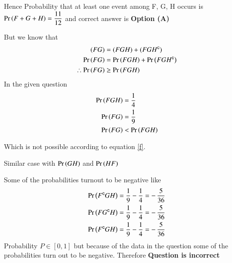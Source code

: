 \documentclass[journal,12pt,twocolumn]{IEEEtran}
\begin{document}
Hence Probability that at least one event among F, G, H occurs is $\Pr\left(F + G + H\right)=\dfrac{11}{12}$ and correct answer is \textbf{Option (A)}
\null \par \null
But we know that 
\begin{align}
(F G) &= (F G H) + (F G H^{\mathsf{c}}) \\
\Pr\left(F G\right) &= \Pr\left(F G H\right) + \Pr\left(F G H^{\mathsf{c}}\right) \\
\therefore \Pr\left(F G\right) &\geq \Pr\left(F G H\right) \label{f}
\end{align}
In the given question 
\begin{align}
\Pr\left(F G H\right) &= \dfrac{1}{4} \\
\Pr\left(F G\right)   &= \dfrac{1}{9} \\
\Pr\left(F G \right) &< \Pr\left(F G H\right) 
\end{align}

Which is not possible according to equation \eqref{f}. 

Similar case with $\Pr\left(G H\right)$ and $\Pr\left(H F\right)$ 

Some of the probabilities turnout to be negative like 
\begin{align}
\Pr\left(F^{\mathsf{c}} G H\right)  &= \dfrac{1}{9} - \dfrac{1}{4} = -\,\dfrac{5}{36} \\
\Pr\left(F G^{\mathsf{c}} H\right)  &= \dfrac{1}{9} - \dfrac{1}{4} = -\,\dfrac{5}{36} \\
\Pr\left(F^{\mathsf{c}} G H\right)  &= \dfrac{1}{9} - \dfrac{1}{4} = -\,\dfrac{5}{36} 
\end{align}
Probability $P\in [0,1]$ but because of the data in the question some of the probabilities turn out to be negative. Therefore \textbf{Question is incorrect}
\end{document}
